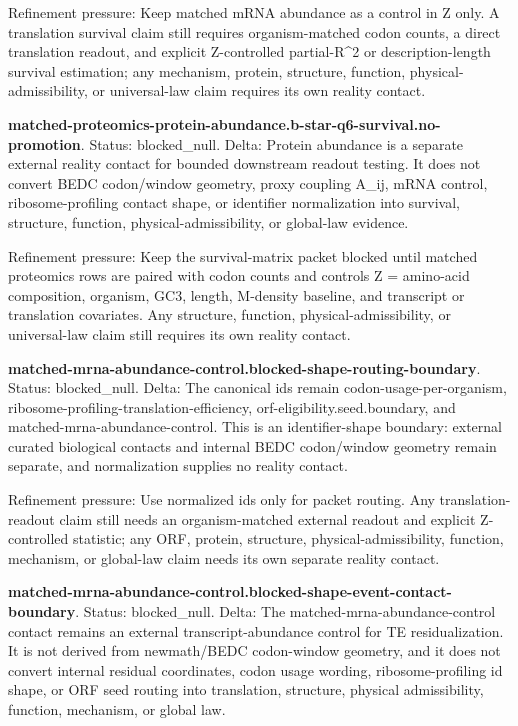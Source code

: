 Refinement pressure: Keep matched mRNA abundance as a control in Z only. A translation survival claim still requires organism-matched codon counts, a direct translation readout, and explicit Z-controlled partial-R\textasciicircum{}2 or description-length survival estimation; any mechanism, protein, structure, function, physical-admissibility, or universal-law claim requires its own reality contact.

\textbf{matched-proteomics-protein-abundance.b-star-q6-survival.no-promotion}. Status: blocked\_null. Delta: Protein abundance is a separate external reality contact for bounded downstream readout testing. It does not convert BEDC codon/window geometry, proxy coupling A\_ij, mRNA control, ribosome-profiling contact shape, or identifier normalization into survival, structure, function, physical-admissibility, or global-law evidence.

Refinement pressure: Keep the survival-matrix packet blocked until matched proteomics rows are paired with codon counts and controls Z = amino-acid composition, organism, GC3, length, M-density baseline, and transcript or translation covariates. Any structure, function, physical-admissibility, or universal-law claim still requires its own reality contact.

\textbf{matched-mrna-abundance-control.blocked-shape-routing-boundary}. Status: blocked\_null. Delta: The canonical ids remain codon-usage-per-organism, ribosome-profiling-translation-efficiency, orf-eligibility.seed.boundary, and matched-mrna-abundance-control. This is an identifier-shape boundary: external curated biological contacts and internal BEDC codon/window geometry remain separate, and normalization supplies no reality contact.

Refinement pressure: Use normalized ids only for packet routing. Any translation-readout claim still needs an organism-matched external readout and explicit Z-controlled statistic; any ORF, protein, structure, physical-admissibility, function, mechanism, or global-law claim needs its own separate reality contact.

\textbf{matched-mrna-abundance-control.blocked-shape-event-contact-boundary}. Status: blocked\_null. Delta: The matched-mrna-abundance-control contact remains an external transcript-abundance control for TE residualization. It is not derived from newmath/BEDC codon-window geometry, and it does not convert internal residual coordinates, codon usage wording, ribosome-profiling id shape, or ORF seed routing into translation, structure, physical admissibility, function, mechanism, or global law.

